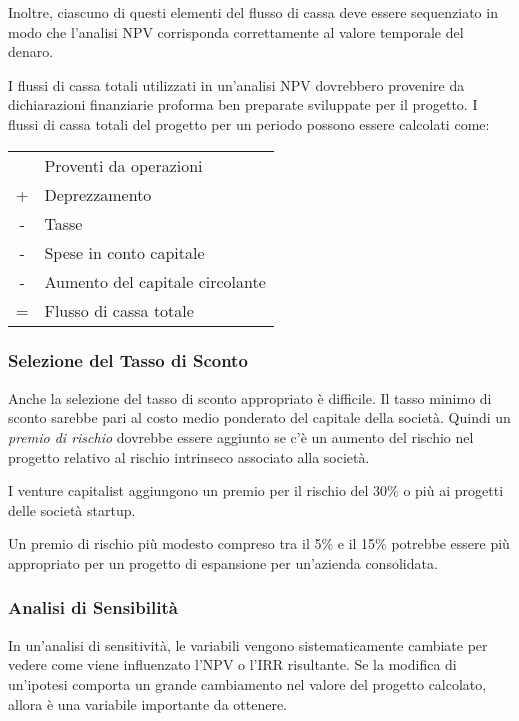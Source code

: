 \documentclass[a4paper,portrait,12pt]{article}
\theoremstyle{definition}
\begin{document}
Inoltre, ciascuno di questi elementi del flusso di cassa deve essere sequenziato in modo che l'analisi NPV corrisponda correttamente al valore temporale del denaro.

I flussi di cassa totali utilizzati in un'analisi NPV dovrebbero provenire da dichiarazioni finanziarie proforma ben preparate sviluppate per il progetto.
I flussi di cassa totali del progetto per un periodo possono essere calcolati come:

\begin{table}[H]
\begin{center}
\begin{tabular}{cl}
& Proventi da operazioni\\
+ & Deprezzamento\\
- & Tasse\\
- & Spese in conto capitale\\
- & Aumento del capitale circolante\\
= & Flusso di cassa totale\\
\end{tabular}
\end{center}
\end{table}

\subsubsection{Selezione del Tasso di Sconto}

Anche la selezione del tasso di sconto appropriato è difficile. Il tasso minimo di sconto sarebbe pari al costo medio ponderato del capitale della società.
Quindi un \emph{premio di rischio} dovrebbe essere aggiunto se c'è un aumento del rischio nel progetto relativo al rischio intrinseco associato alla società.

I venture capitalist aggiungono un premio per il rischio del 30\% o più ai progetti delle società startup.

Un premio di rischio più modesto compreso tra il 5\% e il 15\% potrebbe essere più appropriato per un progetto di espansione per un'azienda consolidata.

\subsubsection{Analisi di Sensibilità}

In un'analisi di sensitività, le variabili vengono sistematicamente cambiate per vedere come viene influenzato l'NPV o l'IRR risultante.
Se la modifica di un'ipotesi comporta un grande cambiamento nel valore del progetto calcolato, allora è una variabile importante da ottenere.\\
\end{document}
